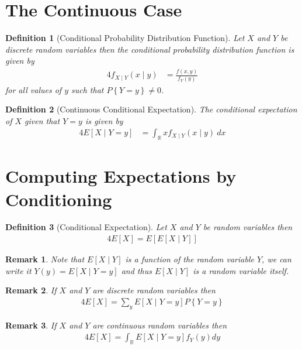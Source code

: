 \documentclass[11pt, oneside]{book}   	%
\newtheorem{definition}{Definition}[chapter]
\newtheorem{remark}{Remark}[chapter]
\newcommand{\set}[1]{\left\{#1\right\}}
\begin{document}
\section{The Continuous Case}

\begin{definition}[Conditional Probability Distribution Function]
	Let $X$ and $Y$ be discrete random variables then the \emph{conditional probability distribution function} is given by 
	\begin{alignat}{4}
		f_{X\mid Y}(x\mid y)&=\frac{f(x, y)}{f_Y(y)}
	\end{alignat}
	for all values of $y$ such that $P\set{Y=y}\neq 0$. 
\end{definition}

\begin{definition}[Continuous Conditional Expectation]
	The \emph{conditional expectation} of $X$ given that $Y=y$ is given by 
	\begin{alignat}{4}
		E[X\mid Y=y]&=\int_{\mathbb{R}}xf_{X\mid Y}(x\mid y)~dx
	\end{alignat}
\end{definition}

\section{Computing Expectations by Conditioning}

\begin{definition}[Conditional Expectation]
	Let $X$ and $Y$ be random variables then 
	\begin{alignat}{4}
		E[X]=E[E[X\mid Y]]
	\end{alignat}
\end{definition}

\begin{remark}
	Note that $E[X\mid Y]$ is a function of the random variable $Y$, we can write it $Y(y)=E[X\mid Y=y]$ and thus $E[X\mid Y]$ is a random variable itself. 
\end{remark}

\begin{remark}
	If $X$ and $Y$ are discrete random variables then 
	\begin{alignat}{4}
		E[X]=\sum_{y} E[X\mid Y=y]P\set{Y=y}
	\end{alignat}
\end{remark}

\begin{remark}
	If $X$ and $Y$ are continuous random variables then 
	\begin{alignat}{4}
		E[X]=\int_\mathbb{R} E[X\mid Y=y]f_Y(y)dy
	\end{alignat}
\end{remark}



\clearpage
{}
\printindex
\end{document}
